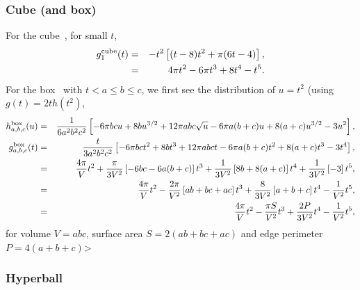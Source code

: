 \subsubsection{Cube (and box)}
For the cube~\cite{weisstein:_cube_line_picking}, for small $t$,
\begin{eqnarray}
  g^{\rm cube}_{1}(t) & = &  -t^2 \left[ (t-8)t^2 + \pi (6 t - 4) \right], \nonumber \\
                    & = & 4 \pi t^2 - 6 \pi t^3 + 8 t^4 - t^5.
\end{eqnarray}
For the box~\cite{philip:_probab_distr_distan_between_two} with $t < a
\leq b \leq c$, we first see the distribution  of $u=t^2$ (using $g(t)
= 2 t h(t^2)$, 
\begin{eqnarray}
  h^{\rm box}_{a,b,c}(u) & = &
  \frac{1}{6 a^2 b^2 c^2} \left[
    - 6 \pi b c u + 8 b u^{3/2}
    +12 \pi a b c \sqrt u - 6 \pi a(b + c)u + 8(a + c) u^{3/2} - 3 u^2
    \right], \nonumber \\
  g^{\rm box}_{a,b,c}(t)  & = &
  \frac{t }{3 a^2 b^2 c^2} \left[
    - 6 \pi b c t^2 + 8 b t^{3}
    +12 \pi a b c t - 6 \pi a(b + c)t^2 + 8(a + c) t^{3} - 3 t^4
    \right], \nonumber \\
 & = & \frac{4 \pi}{V} t^2
       + \frac{\pi }{3 V^2} \left[ -6 b c - 6 a (b+c) \right] t^3
       + \frac{1}{3 V^2} \left[ 8 b + 8 (a+c) \right] t^4
       + \frac{1}{3 V^2} \left[ - 3 \right] t^5, \nonumber \\
 & = & \frac{4 \pi}{V} t^2
       - \frac{2 \pi }{ V^2} \left[ a b + bc + a c \right] t^3
       + \frac{8}{3 V^2} \left[ a + b + c \right] t^4
       - \frac{1}{V^2} t^5,  \nonumber \\
 & = & \frac{4 \pi}{V} t^2
       - \frac{\pi S}{ V^2} t^3
       + \frac{2 P}{3 V^2}  t^4
       - \frac{1}{V^2} t^5, 
\end{eqnarray}
for volume $V = a b c$, surface area $S = 2(a b + bc + a c)$ and edge
perimeter $P = 4(a + b + c)$>


\subsubsection{Hyperball}

